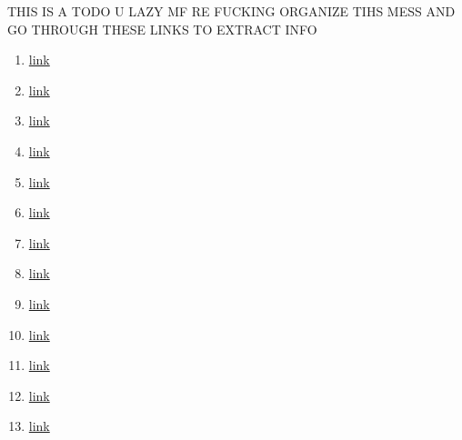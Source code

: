 \documentclass{article}
\begin{document}
THIS IS A TODO U LAZY MF RE FUCKING ORGANIZE TIHS MESS AND GO THROUGH THESE LINKS TO EXTRACT INFO
\begin{enumerate}
    \item \href{https://www.youtube.com/watch?v=WujIkCgawFI&list=PLmK1EnKxphinxBub5hL0ZoJXWoqjkGE19&index=11}{link}
    \item \href{https://www.youtube.com/watch?v=jgh0TNfx0gQ}{link}
    \item \href{https://eshop.se.com/in/blog/post/difference-between-active-power-reactive-power-and-apparent-power.html#}{link}
    \item \href{https://www.allaboutcircuits.com/textbook/alternating-current/chpt-11/true-reactive-and-apparent-power/}{link}
    \item \href{https://laurenselectric.com/commercial-services/understanding-power-factor/}{link}
    \item \href{https://www.eeeguide.com/substations-interview-questions-and-answers/}{link}
    \item \href{https://circuitglobe.com/types-of-faults-in-power-system.html}{link}
    \item \href{https://peguru.com/2019/08/voltage-transformer/}{link}
    \item \href{https://www.pes-psrc.org/kb/report/047.pdf}{link}
    \item \href{https://electrical-engineering-portal.com/download-center/books-and-guides/relays}{link}
    \item \href{https://www.studyforfe.com/blog/fundamentals-of-single-line-diagrams/}{link}
    \item \href{https://eepower.com/technical-articles/calculating-the-turns-ratio-of-a-transformer/}{link}
    \item \href{https://eepower.com/power-electronics-textbook/vol-i-electrical-power-systems-design/chapter-5-impedance-matching-and-power-transfer/understanding-electrical-transformers/#}{link}
\end{enumerate}
\end{document}
